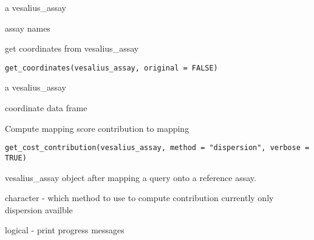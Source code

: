 \documentclass[a4paper]{book}
\begin{document}
%
\begin{Arguments}
\begin{ldescription}
\item[\code{vesalius\_assay}] a vesalius\_assay
\end{ldescription}
\end{Arguments}
%
\begin{Value}
assay names
\end{Value}
%
\begin{Description}
get coordinates from vesalius\_assay
\end{Description}
%
\begin{Usage}
\begin{verbatim}
get_coordinates(vesalius_assay, original = FALSE)
\end{verbatim}
\end{Usage}
%
\begin{Arguments}
\begin{ldescription}
\item[\code{vesalius\_assay}] a vesalius\_assay
\end{ldescription}
\end{Arguments}
%
\begin{Value}
coordinate data frame
\end{Value}
%
\begin{Description}
Compute mapping score contribution to mapping
\end{Description}
%
\begin{Usage}
\begin{verbatim}
get_cost_contribution(vesalius_assay, method = "dispersion", verbose = TRUE)
\end{verbatim}
\end{Usage}
%
\begin{Arguments}
\begin{ldescription}
\item[\code{vesalius\_assay}] vesalius\_assay object after mapping a query 
onto a reference assay.

\item[\code{method}] character - which method to use to compute contribution
currently only dispersion availble

\item[\code{verbose}] logical - print progress messages
\end{ldescription}
\end{Arguments}
\end{document}
